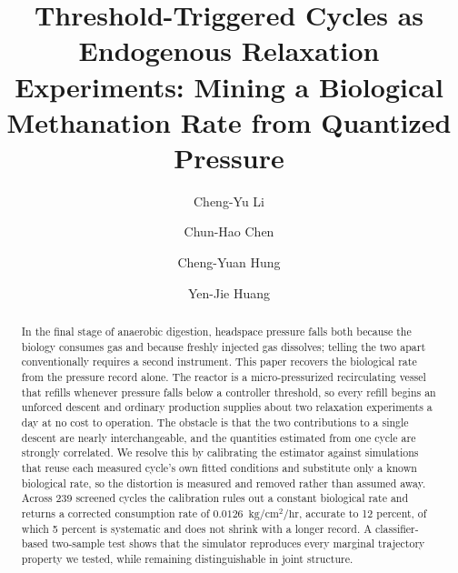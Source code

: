 \documentclass[runningheads]{llncs}
\newcommand{\ratu}{\ensuremath{\mathrm{kg/cm^{2}/hr}}}
\begin{document}
\title{Threshold-Triggered Cycles as Endogenous Relaxation
Experiments: Mining a Biological Methanation Rate from Quantized
Pressure}


\author{Cheng-Yu Li \and
Chun-Hao Chen \and
Cheng-Yuan Hung \and
Yen-Jie Huang}



\maketitle

\begin{abstract}
In the final stage of anaerobic digestion, headspace pressure falls
both because the biology consumes gas and because freshly injected gas
dissolves; telling the two apart conventionally requires a second
instrument. This paper recovers the biological rate from the pressure
record alone. The reactor is a micro-pressurized recirculating vessel
that refills whenever pressure falls below a controller threshold, so
every refill begins an unforced descent and ordinary production
supplies about two relaxation experiments a day at no cost to
operation. The obstacle is that the two contributions to a single
descent are nearly interchangeable, and the quantities estimated from
one cycle are strongly correlated. We resolve this by calibrating the estimator against
simulations that reuse each measured cycle's own fitted conditions and
substitute only a known biological rate, so the distortion is measured
and removed rather than assumed away. Across 239 screened
cycles the calibration rules out a constant biological rate and returns
a corrected consumption rate of $0.0126$~\ratu{},
accurate to 12 percent, of which 5 percent is systematic and does
not shrink with a longer record. A classifier-based two-sample test
shows that the simulator reproduces every marginal trajectory property
we tested, while remaining distinguishable in joint structure.

\end{abstract}
\end{document}
